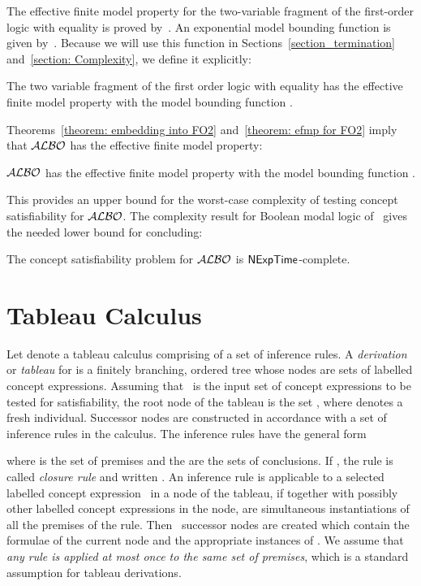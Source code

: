 \documentclass[leqno
,pdflatex
,prodmode
,acmtocl
]{acmsmall}
\newcommand{\mathcmd}[1]{\ensuremath{#1}\xspace}
\newcommand{\dlfont}{\mathcal}
\newcommand{\dl}[1]{\mathcmd{\dlfont{#1}}}
\newcommand{\ALBOid}{\dl{ALBO\smash[t]{\mbox{}}}}
\def\complexityfont{\sffamily\upshape}
\def\complexity#1{\mathcmd{\text{\complexityfont #1}}}
\def\NExpTime{\complexity{NExpTime}}
\begin{document}
The effective finite model property for the two-variable fragment 
of the first-order logic with equality is proved by~.
An exponential model bounding function  is given
by~. 
Because we will use this function in Sections~\ref{section_termination} and~\ref{section: Complexity},
we define it explicitly:


\begin{theorem}\label{theorem: efmp for FO2}
The two variable fragment of the first order logic with equality
has the effective finite model property with the model bounding
function .
\end{theorem}

Theorems~\ref{theorem: embedding into FO2} and~\ref{theorem: efmp for FO2}
imply that \ALBOid has the effective finite model property:
\begin{theorem}[Effective Finite Model Property of \ALBOid]\label{theorem: EFMP}
\ALBOid has the effective finite model property
with the model bounding function .
\end{theorem}
This provides an upper bound for the worst-case complexity of testing 
concept satisfiability
for \ALBOid. 
The complexity result for Boolean modal
logic of~ gives the needed lower bound for concluding:
\begin{theorem}
The concept satisfiability problem for \ALBOid is \NExpTime-complete.
\end{theorem}

\section{Tableau Calculus}
\label{section_tableau}

Let  denote a tableau calculus comprising of a set of inference
rules. 
A \emph{derivation} or \emph{tableau} for  is a finitely branching,
ordered tree whose nodes are sets of labelled concept expressions.
Assuming that~ is the input set of concept expressions
to be tested for satisfiability, the root node of the tableau is the
set , where  denotes a fresh individual.
Successor nodes are constructed in accordance with a set of inference
rules in the calculus.
The inference rules have the general form 

where  is the set of premises and the 
are the sets of conclusions.
If , the rule is called \emph{closure rule} and written 
.
An inference rule is applicable to a selected labelled concept
expression~ in a
node of the tableau, if  together with possibly other
labelled concept expressions in the node, are simultaneous
instantiations of all the premises of the rule.
Then ~successor nodes are created which contain the formulae of
the current node and the appropriate instances of .
We assume that \emph{any rule is applied at most once to the same set
of premises}, which is a standard assumption for tableau derivations.
\end{document}

